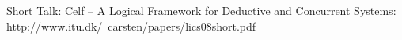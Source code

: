 \begin{thebibliography}{9}
\label{Biblio}
 Short Talk: Celf – A Logical Framework for Deductive and Concurrent Systems: http://www.itu.dk/~carsten/papers/lics08short.pdf
\end{thebibliography}